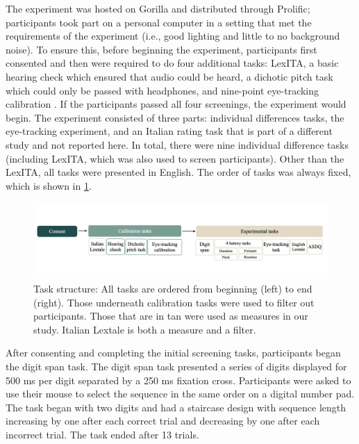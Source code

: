 The experiment was hosted on Gorilla and distributed through Prolific; participants took part on a personal computer in a setting that met the requirements of the experiment (i.e., good lighting and little to no background noise). To ensure this, before beginning the experiment, participants first consented and then were required to do four additional tasks: LexITA, a basic hearing check which ensured that audio could be heard, a dichotic pitch task \citep{milne_2021} which could only be passed with headphones, and nine-point eye-tracking calibration \citep{bramlett_wiener_24-AOW}. If the participants passed all four screenings, the experiment would begin. The experiment consisted of three parts: individual differences tasks, the eye-tracking experiment, and an Italian rating task that is part of a different study and not reported here. In total, there were nine individual difference tasks (including LexITA, which was also used to screen participants). Other than the LexITA, all tasks were presented in English. The order of tasks was always fixed, which is shown in \ref{fig:task_structure}. 

\begin{figure}[H]
  \centering
  \includegraphics[width=1\linewidth]{visuals/task_structure.jpg} %
  \caption{Task structure: All tasks are ordered from beginning (left) to end (right). Those underneath calibration tasks were used to filter out participants. Those that are in tan were used as measures in our study. Italian Lextale is both a measure and a filter.}
  \label{fig:task_structure}
\end{figure}

After consenting and completing the initial screening tasks, participants began the digit span task. The digit span task presented a series of digits displayed for 500 ms per digit separated by a 250 ms fixation cross. Participants were asked to use their mouse to select the sequence in the same order on a digital number pad. The task began with two digits and had a staircase design with sequence length increasing by one after each correct trial and decreasing by one after each incorrect trial. The task ended after 13 trials. 

